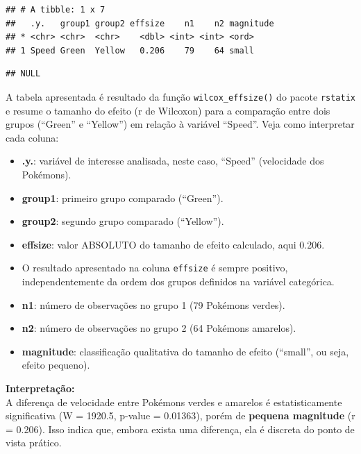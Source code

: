 \documentclass[
]{book}
\newenvironment{Shaded}{\begin{snugshade}}{\end{snugshade}}
\newcommand{\FunctionTok}[1]{\textcolor[rgb]{0.13,0.29,0.53}{\textbf{#1}}}
\newcommand{\NormalTok}[1]{#1}
\newcommand{\SpecialCharTok}[1]{\textcolor[rgb]{0.81,0.36,0.00}{\textbf{#1}}}
\providecommand{\tightlist}{%
  \setlength{\itemsep}{0pt}\setlength{\parskip}{0pt}}
\begin{document}
\begin{verbatim}
## # A tibble: 1 x 7
##   .y.   group1 group2 effsize    n1    n2 magnitude
## * <chr> <chr>  <chr>    <dbl> <int> <int> <ord>    
## 1 Speed Green  Yellow   0.206    79    64 small
\end{verbatim}

\begin{Shaded}
\end{Shaded}

\begin{verbatim}
## NULL
\end{verbatim}

A tabela apresentada é resultado da função \texttt{wilcox\_effsize()} do pacote \texttt{rstatix} e resume o tamanho do efeito (r de Wilcoxon) para a comparação entre dois grupos (``Green'' e ``Yellow'') em relação à variável ``Speed''. Veja como interpretar cada coluna:

\begin{itemize}
\tightlist
\item
  \textbf{.y.}: variável de interesse analisada, neste caso, ``Speed'' (velocidade dos Pokémons).
\item
  \textbf{group1}: primeiro grupo comparado (``Green'').
\item
  \textbf{group2}: segundo grupo comparado (``Yellow'').
\item
  \textbf{effsize}: valor ABSOLUTO do tamanho de efeito calculado, aqui 0.206.\\
\item
  O resultado apresentado na coluna \texttt{effsize} é sempre positivo, independentemente da ordem dos grupos definidos na variável categórica.
\item
  \textbf{n1}: número de observações no grupo 1 (79 Pokémons verdes).
\item
  \textbf{n2}: número de observações no grupo 2 (64 Pokémons amarelos).
\item
  \textbf{magnitude}: classificação qualitativa do tamanho de efeito (``small'', ou seja, efeito pequeno).
\end{itemize}

\textbf{Interpretação:}\\
A diferença de velocidade entre Pokémons verdes e amarelos é estatisticamente significativa (W = 1920.5, p-value = 0.01363), porém de \textbf{pequena magnitude} (r = 0.206). Isso indica que, embora exista uma diferença, ela é discreta do ponto de vista prático.
\end{document}
